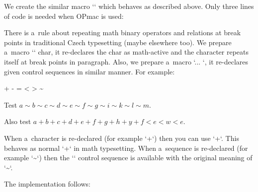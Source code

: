 We create the similar macro `` which behaves as described above. Only three lines of code is needed when OPmac is used: 

\begtt
\def\mathbox#1{{\mathchoice{\mathboxA\displaystyle[]{#1}}{\mathboxA\textstyle[]{#1}} 
    {\mathboxA\textstyle[700]{#1}}{\mathboxA\textstyle[500]{#1}}}} 
\def\mathboxA#1[#2]#3{\hbox{\everymath={#1}\if^#2^\else\typoscale[#2/]\relax\fi #3}} 
\endtt

 


There is a~rule about repeating math binary operators and relations at break points in traditional Czech typesetting (maybe elsewhere too). We prepare a~macro `\mrepeatchar` char, it re-declares the char as math-active and the character repeats itself at break points in paragraph. Also, we prepare a~macro `\mrepeatcs \seqA \seqB \seqC ... \relax`, it re-declares given control sequences in similar manner. For example: 

\begtt
\mrepeatchar+ \mrepeatchar- \mrepeatchar= \mrepeatchar< \mrepeatchar> 
\mrepeatcs \approx \asymp \bot \cap \cdot \circ \cup \diamond 
   \div \equiv \geq \gg \in \leq \ll \odot \oplus \oslash \otimes \paralell 
   \perp \pm \prec \peceq \sim \simeq \subset \subseteq \supset \supseteq 
   \top \triangle \triangleleft \triangleright \uplus \vdash \vee \wedge \relax 
 
\hsize=5cm 
Test $a\sim b\sim c\sim d\sim e\sim f\sim g\sim i\sim k\sim l\sim m$. 
 
Also test $a+b+c+d+e+f+g+h+y+f<e<w<e$. 
\endtt


When a~character is re-declared (for example `\mrepeatchar+`) then you can use `\NR+`. This behaves as normal `+` in math typesetting. When a~sequence is re-declared (for example `\mrepeatcs \sim \relax`) then the `\NRsim` control sequence is available with the original meaning of `\sim`. 



The implementation follows: 

\begtt
\def\NR#1{\csname NR:\string#1\endcsname} 
\def\mrepset#1{\begingroup \lccode`\~=`#1\lowercase{\endgroup\edef~}} 
\def\mrepeatchar#1{%
   \isNRno\NR#1{\mathchardef\NR#1=\mathcode`#1 }%
   \mrepset#1{\NR#1\nobreak \discretionary{}{\hbox{$\NR#1$}}{}} 
   \mathcode`#1="8000 
} 
\def\NRs#1{\csname NR\expandafter\NRx\string#1\endcsname} \def\NRx#1{} 
\def\mrepeatcs#1{\ifx#1\relax \else 
   \isNRno\NRs#1{\let\NRs#1=#1}%
   \edef#1{\NRs#1\noexpand\nobreak \discretionary{}{\hbox{$\NRs#1$}}{}}%
   \expandafter\mrepeatcs\fi 
} 
\def\isNRno#1#2#3{\expandafter\expandafter\expandafter\ifx#1#2\relax 
   \expandafter\expandafter\expandafter#3\else 
   \message{\string#2\space declared already}\fi} 
\endtt


